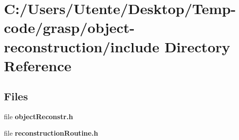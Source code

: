 \section{C\+:/\+Users/\+Utente/\+Desktop/\+Temp-\/code/grasp/object-\/reconstruction/include Directory Reference}
\label{dir_5918a3f2ef113971a1c4f7ee06ed35a4}
\subsection*{Files}
\begin{DoxyCompactItemize}
\item 
file {\bfseries object\+Reconstr.\+h}
\item 
file {\bfseries reconstruction\+Routine.\+h}
\end{DoxyCompactItemize}
